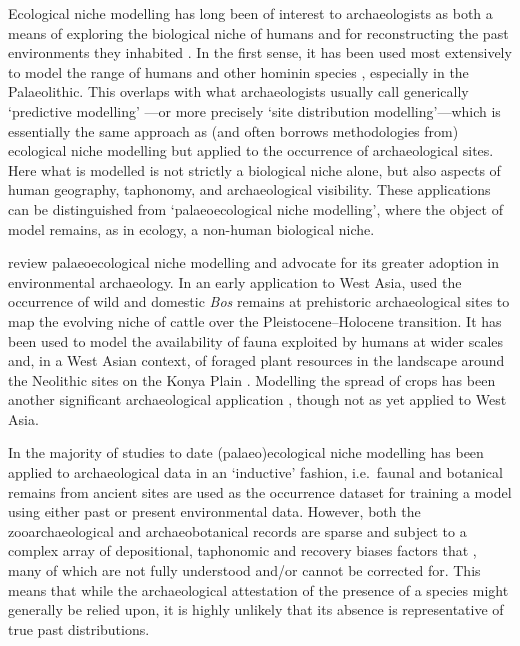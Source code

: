 \documentclass[
  authoryear,
  preprint]{elsarticle}
\begin{document}
Ecological niche modelling has long been of interest to archaeologists
as both a means of exploring the biological niche of humans and for
reconstructing the past environments they inhabited
\citep{DavidPollyEronen2011, FranklinEtAl2015}. In the first sense, it
has been used most extensively to model the range of humans and other
hominin species
\citep[e.g.][]{BenitoEtAl2017, YousefiEtAl2020, BanksEtAl2021, YaworskyEtAl2024a, YaworskyEtAl2024b, GuranEtAl2024},
especially in the Palaeolithic. This overlaps with what archaeologists
usually call generically `predictive modelling'
\citep{VerhagenWhitley2020}---or more precisely `site distribution
modelling'---which is essentially the same approach as (and often
borrows methodologies from) ecological niche modelling but applied to
the occurrence of archaeological sites. Here what is modelled is not
strictly a biological niche alone, but also aspects of human geography,
taphonomy, and archaeological visibility. These applications can be
distinguished from `palaeoecological niche modelling', where the object
of model remains, as in ecology, a non-human biological niche.

\citet{FranklinEtAl2015} review palaeoecological niche modelling and
advocate for its greater adoption in environmental archaeology. In an
early application to West Asia, \citet{ConollyEtAl2012} used the
occurrence of wild and domestic \emph{Bos} remains at prehistoric
archaeological sites to map the evolving niche of cattle over the
Pleistocene--Holocene transition. It has been used to model the
availability of fauna exploited by humans at wider scales
\citep[e.g.][]{deAndresHerreroEtAl2018, YaworskyEtAl2023} and, in a West
Asian context, of foraged plant resources in the landscape around the
Neolithic sites on the Konya Plain \citep{CollinsEtAl2018}. Modelling
the spread of crops has been another significant archaeological
application \citep[e.g.][]{KrzyzanskaEtAl2022, Krzyzanska2023}, though
not as yet applied to West Asia.

In the majority of studies to date (palaeo)ecological niche modelling
has been applied to archaeological data in an `inductive' fashion,
i.e.~faunal and botanical remains from ancient sites are used as the
occurrence dataset for training a model using either past or present
environmental data. However, both the zooarchaeological and
archaeobotanical records are sparse and subject to a complex array of
depositional, taphonomic and recovery biases factors that , many of
which are not fully understood and/or cannot be corrected for. This
means that while the archaeological attestation of the presence of a
species might generally be relied upon, it is highly unlikely that its
absence is representative of true past distributions.
\end{document}
